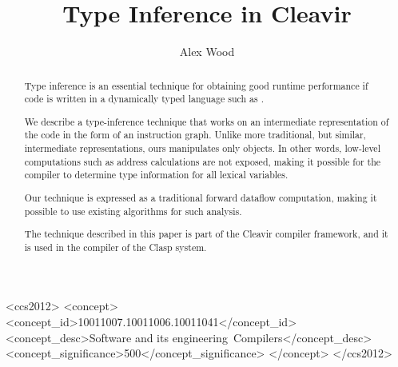 \documentclass{sig-alternate-05-2015}
\def\inputtex#1{}
\begin{document}
\title{Type Inference in Cleavir}
\author{\alignauthor
  Alex Wood}

\maketitle

\begin{abstract}
Type inference is an essential technique for obtaining good runtime
performance if code is written in a dynamically typed language such
as \commonlisp{}.

We describe a type-inference technique that works on an intermediate
representation of the code in the form of an instruction graph.
Unlike more traditional, but similar, intermediate representations,
ours manipulates only \commonlisp{} objects.  In other words,
low-level computations such as address calculations are not exposed,
making it possible for the compiler to determine type information for
all lexical variables.

Our technique is expressed as a traditional forward dataflow
computation, making it possible to use existing algorithms for such
analysis.

The technique described in this paper is part of the Cleavir compiler
framework, and it is used in the compiler of the Clasp \commonlisp{}
system.
\end{abstract}

\begin{CCSXML}
<ccs2012>
<concept>
<concept_id>10011007.10011006.10011041</concept_id>
<concept_desc>Software and its engineering~Compilers</concept_desc>
<concept_significance>500</concept_significance>
</concept>
</ccs2012>
\end{CCSXML}


\printccsdesc


\inputtex{spec-macros.tex}

\inputtex{sec-introduction.tex}
\inputtex{sec-previous.tex}
\inputtex{sec-hir.tex}
\inputtex{sec-algorithm.tex}
\inputtex{sec-optimizations.tex}
\inputtex{sec-conclusions.tex}
\inputtex{sec-acknowledgements.tex}



\end{document}
